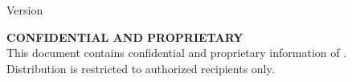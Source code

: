 \begin{titlepage}
    \centering
    \vspace*{2cm}
    
    \vspace{1cm}
    
    {\Huge\textbf{\color{PrimaryColor}\DocumentTitle}}
    
    \vspace{0.5cm}
    {\Large\color{SecondaryColor}\DocumentSubtitle}
    
    \vspace{2cm}
    
    
    \vspace{1cm}
    
    \begin{minipage}[t]{0.3\textwidth}
    \end{minipage}
    \hfill
    \begin{minipage}[t]{0.3\textwidth}
    \end{minipage}
    \hfill
    \begin{minipage}[t]{0.3\textwidth}
    \end{minipage}
    
    \vspace{3cm}
    
    {\large\textbf{\DocumentAuthor}}
    
    \vspace{0.5cm}
    {\color{TextColor}\DocumentDate}
    
    \vspace{0.5cm}
    {\small Version \DocumentVersion}
    
    \vfill
    
    \begin{center}
        \small\color{AccentColor}
        \textbf{CONFIDENTIAL AND PROPRIETARY}\\
        This document contains confidential and proprietary information of \CompanyName.\\
        Distribution is restricted to authorized recipients only.
    \end{center}
    
\end{titlepage}

\thispagestyle{empty}
\newpage